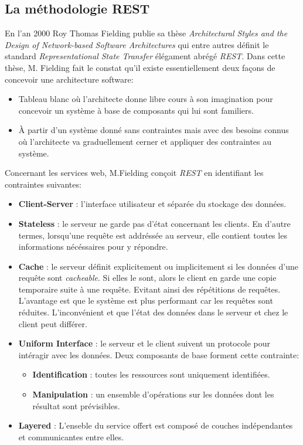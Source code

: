 \subsection{La méthodologie REST}
En l'an 2000 Roy Thomas Fielding publie sa thèse \textit{Architectural Styles and the Design of Network-based Software Architectures} qui entre autres définit le standard \textit{Representational State Transfer} élégament abrégé \textit{REST}. Dans cette thèse, M. Fielding fait le constat qu'il existe essentiellement deux façons de concevoir une architecture software:
\begin{itemize}
    \item Tableau blanc où l'architecte donne libre cours à son imagination pour concevoir un système à base de composants qui lui sont familiers.
    \item À partir d'un système donné sans contraintes mais avec des besoins connus où l'architecte va graduellement cerner et appliquer des contraintes au système.  
\end{itemize}
\smallskip
Concernant les services web, M.Fielding conçoit \textit{REST} en identifiant les contraintes suivantes: 
\smallskip
\begin{itemize}
    \item \textbf{Client-Server} : l'interface utilisateur et séparée du stockage des données.
    \item \textbf{Stateless} : le serveur ne garde pas d'état concernant les clients. En d'autre termes, lorsqu'une requête est addréssée au serveur, elle contient toutes les informations nécéssaires pour y répondre.
    \item \textbf{Cache} : le serveur définit explicitement ou implicitement si les données d'une requête sont \textit{cacheable}. Si elles le sont, alors le client en garde une copie temporaire suite à une requête. Evitant ainsi des répétitions de requêtes. L'avantage est que le système est plus performant car les requêtes sont réduites. L'inconvénient et que l'état des données dans le serveur et chez le client peut différer.
    \item \textbf{Uniform Interface} : le serveur et le client suivent un protocole pour intéragir avec les données. Deux composants de base forment cette contrainte:
    \smallskip
    \begin{itemize}
        \item \textbf{Identification} : toutes les ressources sont uniquement identifiées.
        \item \textbf{Manipulation} : un ensemble d'opérations sur les données dont les résultat sont prévisibles.
    \end{itemize}
    \smallskip
    \item \textbf{Layered} : L'enseble du service offert est composé de couches indépendantes et communicantes entre elles.
\end{itemize}
\smallskip

